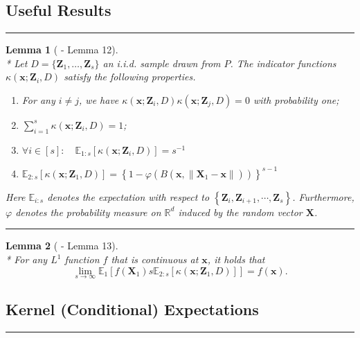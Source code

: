 \documentclass[letterpaper,10pt]{article}
\numberwithin{equation}{section}
\numberwithin{thm}{section}
\newtheorem{lem}{Lemma}
\numberwithin{lem}{section}
\numberwithin{cor}{section}
\newcommand{\E}{\mathbb{E}}
\newcommand{\1}{\mathbbm{1}}
\begin{document}
\subsection{Useful Results}
\hrule

\begin{lem}[\citet{demirkaya_optimal_2024} - Lemma 12]\label{lem:dem12}\mbox{}\\*
	Let $D = \{\mathbf{Z}_1, \dotsc, \mathbf{Z}_s\}$ an i.i.d. sample drawn from $P$.
	The indicator functions $\kappa\left(\mathbf{x}; \mathbf{Z}_i, D\right)$ satisfy the following properties.
	\begin{enumerate}
		\item For any $i \neq j$, we have $\kappa\left(\mathbf{x}; \mathbf{Z}_i, D\right) \kappa\left(\mathbf{x}; \mathbf{Z}_j, D\right)=0$ with probability one;
		\item $\sum_{i=1}^{s} \kappa\left(\mathbf{x}; \mathbf{Z}_i, D\right)=1$;
		\item $\forall i \in [s]: \quad \mathbb{E}_{1:s}\left[\kappa\left(\mathbf{x}; \mathbf{Z}_i, D\right)\right]=s^{-1}$
		\item $\mathbb{E}_{2: s}\left[\kappa\left(\mathbf{x}; \mathbf{Z}_1, D\right)\right]=\left\{1-\varphi\left(B\left(\mathbf{x},\left\|\mathbf{X}_1-\mathbf{x}\right\|\right)\right)\right\}^{s-1}$
	\end{enumerate}
	Here $\mathbb{E}_{i: s}$ denotes the expectation with respect to $\left\{\mathbf{Z}_i, \mathbf{Z}_{i+1}, \cdots, \mathbf{Z}_s\right\}$.
	Furthermore, $\varphi$ denotes the probability measure on $\mathbb{R}^{d}$ induced by the random vector $\mathbf{X}$.
\end{lem}

\hrule

\begin{lem}[\citet{demirkaya_optimal_2024} - Lemma 13]\label{lem:dem13}\mbox{}\\*
	For any $L^1$ function $f$ that is continuous at $\mathbf{x}$, it holds that
	\begin{equation}
		\lim _{s \rightarrow \infty} \E_1\left[f\left(\mathbf{X}_1\right) s \E_{2: s}\left[\kappa(\mathbf{x}; \mathbf{Z}_1, D)\right]\right]
		= f(\mathbf{x}).
	\end{equation}
\end{lem}

\subsection{Kernel (Conditional) Expectations}
\hrule
\end{document}

